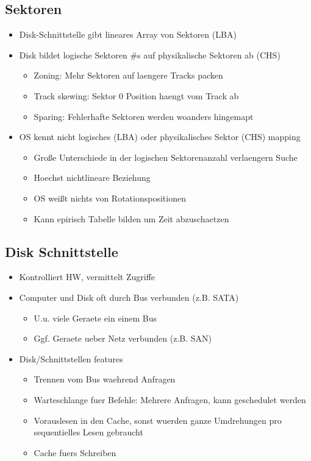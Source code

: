 \documentclass[a4paper]{scrreprt}
\begin{document}
\subsection{Sektoren}
\begin{itemize}
	\item Disk-Schnittstelle gibt lineares Array von Sektoren (LBA)
	\item Disk bildet logische Sektoren \#s auf physikalische Sektoren ab (CHS)
		\begin{itemize}
			\item Zoning: Mehr Sektoren auf laengere Tracks packen
			\item Track skewing: Sektor 0 Position haengt vom Track ab
			\item Sparing: Fehlerhafte Sektoren werden woanders hingemapt
		\end{itemize}
	\item OS kennt nicht logisches (LBA) oder physikalisches Sektor (CHS) mapping
		\begin{itemize}
			\item Große Unterschiede in der logischen Sektorenanzahl verlaengern Suche
			\item Hoechst nichtlineare Beziehung
			\item OS weißt nichts von Rotationspositionen
			\item Kann epirisch Tabelle bilden um Zeit abzuschaetzen
		\end{itemize}
\end{itemize}

\subsection{Disk Schnittstelle}
\begin{itemize}
	\item Kontrolliert HW, vermittelt Zugriffe
	\item Computer und Disk oft durch Bus verbunden (z.B. SATA)
		\begin{itemize}
			\item U.u. viele Geraete ein einem Bus
			\item Ggf. Geraete ueber Netz verbunden (z.B. SAN)
		\end{itemize}
	\item Disk/Schnittstellen features
		\begin{itemize}
			\item Trennen vom Bus waehrend Anfragen
			\item Warteschlange fuer Befehle: Mehrere Anfragen, kann geschedulet werden
			\item Vorauslesen in den Cache, sonst wuerden ganze Umdrehungen pro sequentielles Lesen gebraucht
			\item Cache fuers Schreiben
		\end{itemize}
\end{itemize}
\end{document}
